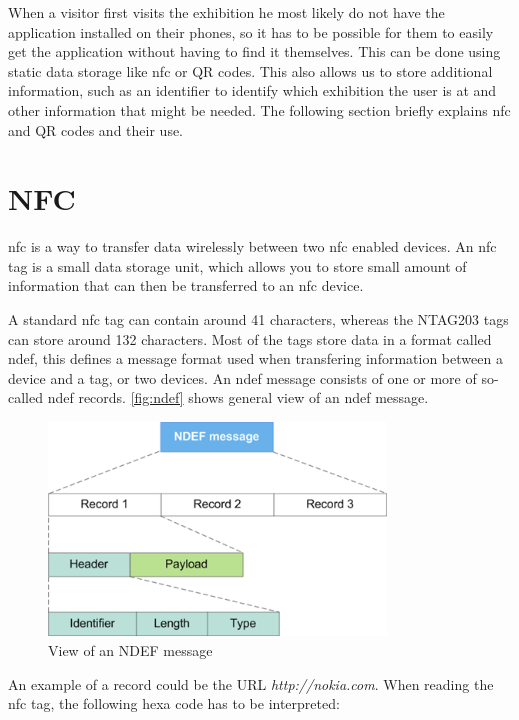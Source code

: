 When a visitor first visits the exhibition he most likely do not have the application installed on their phones, so it has to be possible for them to easily get the application without having to find it themselves. This can be done using static data storage like \ac{nfc} or QR codes. This also allows us to store additional information, such as an identifier to identify which exhibition the user is at and other information that might be needed. The following section briefly explains \ac{nfc} and QR codes and their use. 

\section*{NFC}
\ac{nfc} is a way to transfer data wirelessly  between two \ac{nfc} enabled devices. 
An \ac{nfc} tag is a small data storage unit, which allows you to store small amount of information that can then be transferred to an \ac{nfc} device. 

A standard \ac{nfc} tag can contain around 41 characters, whereas the NTAG203 tags can store around 132 characters\citep{nfccap}. Most of the tags store data in a format called \ac{ndef}, this defines a message format used when transfering information between a device and a tag, or two devices. An \ac{ndef} message consists of one or more of so-called \ac{ndef} records. \autoref{fig:ndef} shows general view of an \ac{ndef} message.

\begin{figure}[H]
\centering
\includegraphics[width=0.8\textwidth]{img/nfcrecord.png}
\caption{View of an NDEF message\citep{ndef}}
\label{fig:ndef}
\end{figure}

An example of a record could be the URL \textit{http://nokia.com}. When reading the \ac{nfc} tag, the following hexa code has to be interpreted: 

